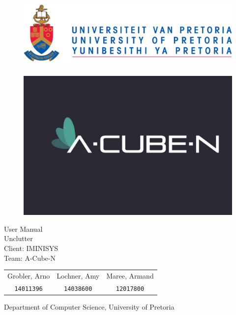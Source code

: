 \documentclass[hidelinks,english]{article}
\date{\today}
\begin{document}
	
	\begin{titlepage}
		\begin{figure}[!t]
			\includegraphics[width=\linewidth]{up_logo.png}
		\end{figure}
		\begin{figure}[!t]
			\includegraphics[width=\linewidth]{acuben.jpg}
		\end{figure}
		\begin{center}
			\huge{User Manual\\}
			\huge{Unclutter}\\
			\large{Client: IMINISYS}\\
			\vspace{10mm}
			\huge{Team: A-Cube-N}\\
		\end{center}
		\begin{center}
			\begin{tabular}{ c c c }
				Grobler, Arno & Lochner, Amy & Maree, Armand \\
				\texttt{14011396} & \texttt{14038600}& \texttt{12017800} \\				
			\end{tabular}
		\end{center}
		\begin{center}
			Department of Computer Science, University of Pretoria
		\end{center}
	\end{titlepage}
	\newpage
	\tableofcontents
	\newpage
	
\end{document}
